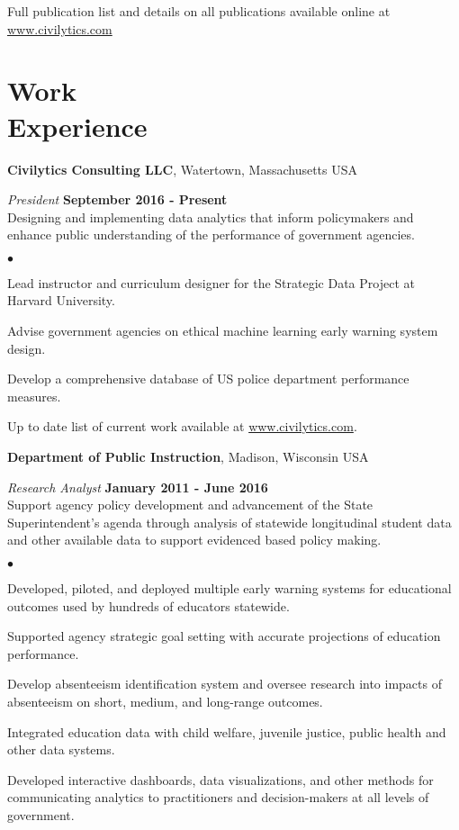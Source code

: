 \documentclass[margin,line]{res}
\newenvironment{list2}{
  \begin{list}{$\bullet$}{%
      \setlength{\itemsep}{0in}
      \setlength{\parsep}{0in} \setlength{\parskip}{0in}
      \setlength{\topsep}{0in} \setlength{\partopsep}{0in} 
      \setlength{\leftmargin}{0.2in}}}{\end{list}}
\begin{document}
\begin{resume}
Full publication list and details on all publications available online at 
\url{www.civilytics.com}

\vspace*{-3mm}
\section{\sc Work \\ Experience}
{\bf Civilytics Consulting LLC}, Watertown, Massachusetts USA

\vspace{-.3cm}
{\em President} \hfill {\bf September 2016 - Present}\\
Designing and implementing data analytics that inform policymakers and enhance 
public understanding of the performance of government agencies.\\
\vspace{-2mm}
\begin{list2}
\item Lead instructor and curriculum designer for the Strategic Data Project at Harvard University.
\item Advise government agencies on ethical machine learning early warning system design. 
\item Develop a comprehensive database of US police department performance measures.
\item Up to date list of current work available at \url{www.civilytics.com}.
\end{list2}
\vspace{-.1cm}


{\bf Department of Public Instruction}, Madison, Wisconsin USA

\vspace{-.3cm}
{\em Research Analyst} \hfill {\bf January 2011 - June 2016}\\
Support agency policy development and advancement of the State Superintendent's agenda through analysis of statewide longitudinal student data and other available data to support evidenced based policy making. 
\begin{list2}
\item Developed, piloted, and deployed multiple early warning systems for educational outcomes 
used by hundreds of educators statewide. 
\item Supported agency strategic goal setting with accurate projections of education performance.
\item Develop absenteeism identification system and oversee research into impacts of 
absenteeism on short, medium, and long-range outcomes.
\item Integrated education data with child welfare, juvenile justice, public health and other 
data systems. 
\item Developed interactive dashboards, data visualizations, and other methods for communicating 
analytics to practitioners and decision-makers at all levels of government.
\end{list2}


\end{resume}
\end{document}
